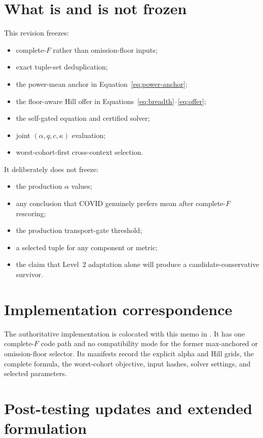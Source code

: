 \documentclass[11pt]{article}
\begin{document}
\section{What is and is not frozen}

This revision freezes:
\begin{itemize}
  \item complete-$F$ rather than omission-floor inputs;
  \item exact tuple-set deduplication;
  \item the power-mean anchor in Equation~\eqref{eq:power-anchor};
  \item the floor-aware Hill offer in Equations~\eqref{eq:breadth}--\eqref{eq:offer};
  \item the self-gated equation and certified solver;
  \item joint $(\alpha,q,c,\kappa)$ evaluation;
  \item worst-cohort-first cross-context selection.
\end{itemize}

It deliberately does not freeze:
\begin{itemize}
  \item the production $\alpha$ values;
  \item any conclusion that COVID genuinely prefers mean after complete-$F$
  rescoring;
  \item the production transport-gate threshold;
  \item a selected tuple for any component or metric;
  \item the claim that Level~2 adaptation alone will produce a
  candidate-conservative survivor.
\end{itemize}

\section{Implementation correspondence}

The authoritative implementation is colocated with this memo in
. It has one
complete-$F$ code path and no compatibility mode for the former max-anchored
or omission-floor selector. Its manifests record the explicit alpha and Hill
grids, the complete formula, the worst-cohort objective, input hashes, solver
settings, and selected parameters.

\section{Post-testing updates and extended formulation}
\label{sec:post-testing-extension}
\end{document}
